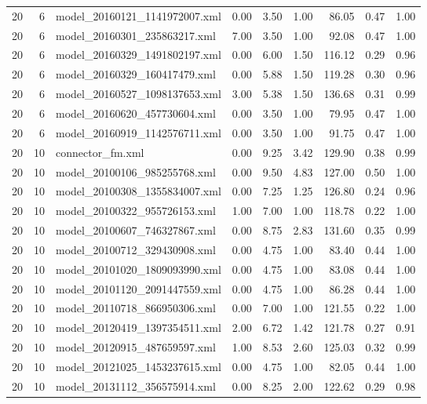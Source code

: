 \begin{table}[ht]
\begin{tabular}{rrlrrrrrr}
   20 &   6 & model\_20160121\_1141972007.xml & 0.00 & 3.50 & 1.00 & 86.05 & 0.47 & 1.00 \\ 
   20 &   6 & model\_20160301\_235863217.xml & 7.00 & 3.50 & 1.00 & 92.08 & 0.47 & 1.00 \\ 
   20 &   6 & model\_20160329\_1491802197.xml & 0.00 & 6.00 & 1.50 & 116.12 & 0.29 & 0.96 \\ 
   20 &   6 & model\_20160329\_160417479.xml & 0.00 & 5.88 & 1.50 & 119.28 & 0.30 & 0.96 \\ 
   20 &   6 & model\_20160527\_1098137653.xml & 3.00 & 5.38 & 1.50 & 136.68 & 0.31 & 0.99 \\ 
   20 &   6 & model\_20160620\_457730604.xml & 0.00 & 3.50 & 1.00 & 79.95 & 0.47 & 1.00 \\ 
   20 &   6 & model\_20160919\_1142576711.xml & 0.00 & 3.50 & 1.00 & 91.75 & 0.47 & 1.00 \\ 
   20 &  10 & connector\_fm.xml & 0.00 & 9.25 & 3.42 & 129.90 & 0.38 & 0.99 \\ 
   20 &  10 & model\_20100106\_985255768.xml & 0.00 & 9.50 & 4.83 & 127.00 & 0.50 & 1.00 \\ 
   20 &  10 & model\_20100308\_1355834007.xml & 0.00 & 7.25 & 1.25 & 126.80 & 0.24 & 0.96 \\ 
   20 &  10 & model\_20100322\_955726153.xml & 1.00 & 7.00 & 1.00 & 118.78 & 0.22 & 1.00 \\ 
   20 &  10 & model\_20100607\_746327867.xml & 0.00 & 8.75 & 2.83 & 131.60 & 0.35 & 0.99 \\ 
   20 &  10 & model\_20100712\_329430908.xml & 0.00 & 4.75 & 1.00 & 83.40 & 0.44 & 1.00 \\ 
   20 &  10 & model\_20101020\_1809093990.xml & 0.00 & 4.75 & 1.00 & 83.08 & 0.44 & 1.00 \\ 
   20 &  10 & model\_20101120\_2091447559.xml & 0.00 & 4.75 & 1.00 & 86.28 & 0.44 & 1.00 \\ 
   20 &  10 & model\_20110718\_866950306.xml & 0.00 & 7.00 & 1.00 & 121.55 & 0.22 & 1.00 \\ 
   20 &  10 & model\_20120419\_1397354511.xml & 2.00 & 6.72 & 1.42 & 121.78 & 0.27 & 0.91 \\ 
   20 &  10 & model\_20120915\_487659597.xml & 1.00 & 8.53 & 2.60 & 125.03 & 0.32 & 0.99 \\ 
   20 &  10 & model\_20121025\_1453237615.xml & 0.00 & 4.75 & 1.00 & 82.05 & 0.44 & 1.00 \\ 
   20 &  10 & model\_20131112\_356575914.xml & 0.00 & 8.25 & 2.00 & 122.62 & 0.29 & 0.98 \\ 

\end{tabular}
\end{table}

